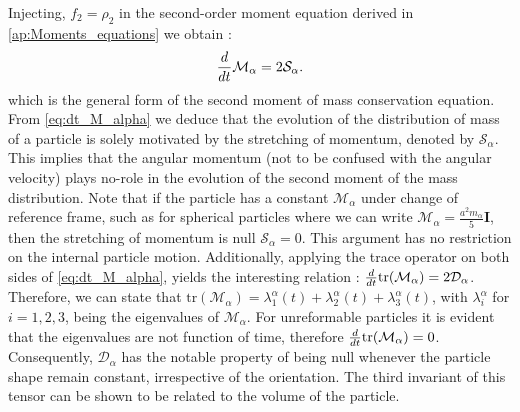 Injecting, $f_2 = \rho_2$ in the second-order moment equation derived in \ref{ap:Moments_equations} we obtain :
\begin{equation}
    \frac{d}{d t} {\mathcal{M}_\alpha}=2\mathcal{S}_\alpha. 
    \label{eq:dt_M_alpha}
\end{equation}
which is the general form of the second moment of mass conservation equation. 
From \ref{eq:dt_M_alpha} we deduce that the evolution of the distribution of mass of a particle is solely motivated by the stretching of momentum, denoted by $\mathcal{S}_\alpha$. 
This implies that the angular momentum (not to be confused with the angular velocity) plays no-role in the evolution of the second moment of the mass distribution. 
Note that if the particle has a constant $\mathcal{M}_\alpha$ under change of reference frame, such as for spherical particles where we can write $\mathcal{M}_\alpha= \frac{a^2 m_\alpha}{5} \textbf{I}$, then the stretching of momentum is null $\mathcal{S}_\alpha=0$.
This argument has no restriction on the internal particle motion. 
Additionally, applying the trace operator on both sides of \ref{eq:dt_M_alpha}, yields the interesting relation : $\frac{d}{d t} {\text{tr}(\mathcal{M}_\alpha)}=2\mathcal{D}_\alpha$.
Therefore, we can state that $\text{tr}(\mathcal{M}_\alpha) = \lambda^\alpha_1(t)+\lambda^\alpha_2(t)+\lambda^\alpha_3(t)$, with $\lambda_i^\alpha$ for $i=1,2,3$, being the eigenvalues of $\mathcal{M}_\alpha$.
For unreformable particles it is evident that the eigenvalues are not function of time, therefore $\frac{d}{d t}{ \text{tr}(\mathcal{M}_\alpha)}=0$.  
Consequently, $\mathcal{D}_\alpha$ has the notable property of being null whenever the particle shape remain constant, irrespective of the orientation.
The third invariant of this tensor can be shown to be related to the volume of the particle. 

